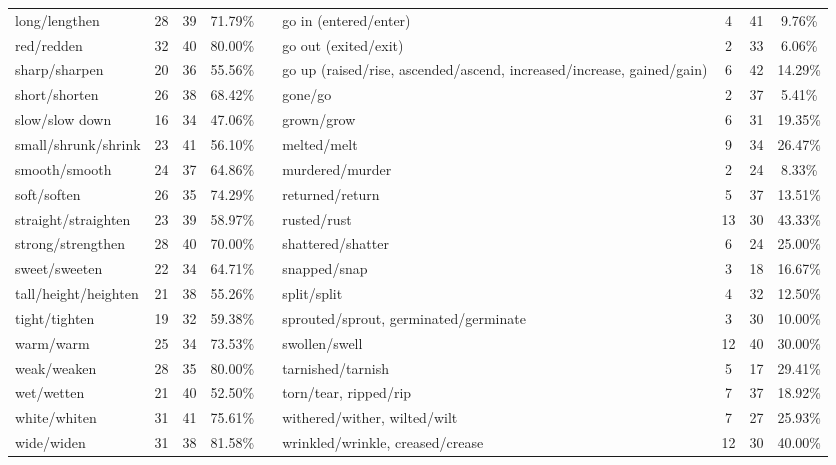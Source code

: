 \begin{tabular}{p{3cm}ccccp{3cm}ccc}
long/lengthen & 28 & 39 & 71.79\% & & go in (entered/enter) & 4 & 41 & 9.76\% \\
red/redden & 32 & 40 & 80.00\% & & go out (exited/exit) & 2 & 33 & 6.06\% \\
sharp/sharpen & 20 & 36 & 55.56\% & & go up (raised/rise, ascended/ascend, increased/increase, gained/gain) & 6 & 42 & 14.29\% \\
short/shorten & 26 & 38 & 68.42\% & & gone/go & 2 & 37 & 5.41\% \\
slow/slow down & 16 & 34 & 47.06\% & & grown/grow & 6 & 31 & 19.35\% \\
small/shrunk/shrink & 23 & 41 & 56.10\% & & melted/melt & 9 & 34 & 26.47\% \\
smooth/smooth & 24 & 37 & 64.86\% & & murdered/murder & 2 & 24 & 8.33\% \\
soft/soften & 26 & 35 & 74.29\% & & returned/return & 5 & 37 & 13.51\% \\
straight/straighten & 23 & 39 & 58.97\% & & rusted/rust & 13 & 30 & 43.33\% \\
strong/strengthen & 28 & 40 & 70.00\% & & shattered/shatter & 6 & 24 & 25.00\% \\
sweet/sweeten & 22 & 34 & 64.71\% & & snapped/snap & 3 & 18 & 16.67\% \\
tall/height/heighten & 21 & 38 & 55.26\% & & split/split & 4 & 32 & 12.50\% \\
tight/tighten & 19 & 32 & 59.38\% & & sprouted/sprout, germinated/germinate & 3 & 30 & 10.00\% \\
warm/warm & 25 & 34 & 73.53\% & & swollen/swell & 12 & 40 & 30.00\% \\
weak/weaken & 28 & 35 & 80.00\% & & tarnished/tarnish & 5 & 17 & 29.41\% \\
wet/wetten & 21 & 40 & 52.50\% & & torn/tear, ripped/rip & 7 & 37 & 18.92\% \\
white/whiten & 31 & 41 & 75.61\% & & withered/wither, wilted/wilt & 7 & 27 & 25.93\% \\
wide/widen & 31 & 38 & 81.58\% & & wrinkled/wrinkle, creased/crease & 12 & 30 & 40.00\%
\end{tabular}